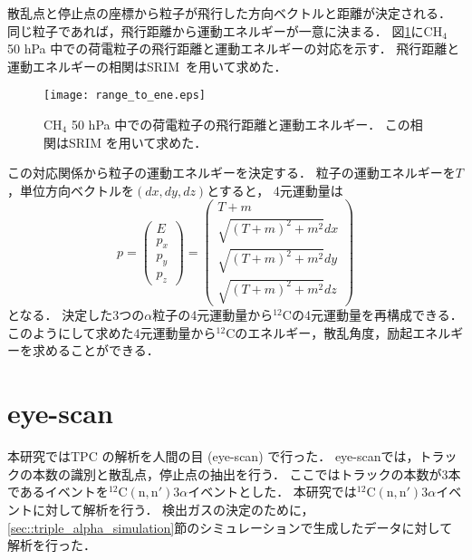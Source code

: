 \documentclass[../master]{subfiles}
\begin{document}
散乱点と停止点の座標から粒子が飛行した方向ベクトルと距離が決定される．
同じ粒子であれば，飛行距離から運動エネルギーが一意に決まる．
図\ref{fig::range_to_ene_alpha}に$\mathrm{CH}_{4}$ 50 hPa 中での荷電粒子の飛行距離と運動エネルギーの対応を示す．
飛行距離と運動エネルギーの相関はSRIM~\cite{srim}を用いて求めた．
\begin{figure}
  \centering
  \texttt{[image: range\_to\_ene.eps]}
  \caption[$\mathrm{CH}_{4}$ 50 hPa 中での荷電粒子の飛行距離と運動エネルギー．]
          {$\mathrm{CH}_{4}$ 50 hPa 中での荷電粒子の飛行距離と運動エネルギー．
            この相関はSRIM を用いて求めた．
          }
  \label{fig::range_to_ene_alpha}
\end{figure}
この対応関係から粒子の運動エネルギーを決定する．
粒子の運動エネルギーを$T$，単位方向ベクトルを$(dx, dy, dz)$とすると，
4元運動量は
\begin{equation}
  p =
  \begin{pmatrix}
    E \\ p_{x} \\ p_{y} \\ p_{z}
  \end{pmatrix}
  =
  \begin{pmatrix}
    T + m \\ \sqrt{(T+m)^2 + m^2} dx \\ \sqrt{(T+m)^2 + m^2} dy \\ \sqrt{(T+m)^2 + m^2} dz
  \end{pmatrix}
  \label{eq::momentum_vector}
\end{equation}
となる．
決定した3つの$\alpha$粒子の4元運動量から${}^{12}\mathrm{C}$の4元運動量を再構成できる．
このようにして求めた4元運動量から${}^{12}\mathrm{C}$のエネルギー，散乱角度，励起エネルギーを求めることができる．


\section{eye-scan}
本研究ではTPC の解析を人間の目 (eye-scan) で行った．
eye-scanでは，トラックの本数の識別と散乱点，停止点の抽出を行う．
ここではトラックの本数が3本であるイベントを${}^{12}\mathrm{C}(\mathrm{n},\mathrm{n}')3\alpha$イベントとした．
本研究では${}^{12}\mathrm{C}(\mathrm{n},\mathrm{n}')3\alpha$イベントに対して解析を行う．
検出ガスの決定のために，\ref{sec::triple_alpha_simulation}節のシミュレーションで生成したデータに対して解析を行った．
\end{document}
